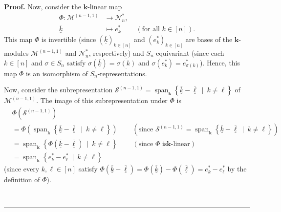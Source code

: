 \documentclass[numbers=enddot,12pt,final,onecolumn,notitlepage]{scrartcl}%
\theoremstyle{definition}
\newenvironment{proof}[1][Proof]{\noindent\textbf{#1.} }{\ \rule{0.5em}{0.5em}}
\begin{document}
\begin{proof}
Now, consider the $\mathbf{k}$-linear map%
\begin{align*}
\Phi:\mathcal{M}^{\left(  n-1,1\right)  }  &  \rightarrow\mathcal{N}_{n}%
^{\ast},\\
\underline{\overline{k}}  &  \mapsto e_{k}^{\ast}\ \ \ \ \ \ \ \ \ \ \left(
\text{for all }k\in\left[  n\right]  \right)  .
\end{align*}
This map $\Phi$ is invertible (since $\left(  \underline{\overline{k}}\right)
_{k\in\left[  n\right]  }$ and $\left(  e_{k}^{\ast}\right)  _{k\in\left[
n\right]  }$ are bases of the $\mathbf{k}$-modules $\mathcal{M}^{\left(
n-1,1\right)  }$ and $\mathcal{N}_{n}^{\ast}$, respectively) and $S_{n}%
$-equivariant (since each $k\in\left[  n\right]  $ and $\sigma\in S_{n}$
satisfy $\sigma\left(  \underline{\overline{k}}\right)  =\underline{\overline
{\sigma\left(  k\right)  }}$ and $\sigma\left(  e_{k}^{\ast}\right)
=e_{\sigma\left(  k\right)  }^{\ast}$). Hence, this map $\Phi$ is an
isomorphism of $S_{n}$-representations.

Now, consider the subrepresentation $\mathcal{S}^{\left(  n-1,1\right)
}=\operatorname*{span}\nolimits_{\mathbf{k}}\left\{  \underline{\overline{k}%
}-\underline{\overline{\ell}}\ \mid\ k\neq\ell\right\}  $ of $\mathcal{M}%
^{\left(  n-1,1\right)  }$. The image of this subrepresentation under $\Phi$
is
\begin{align}
&  \Phi\left(  \mathcal{S}^{\left(  n-1,1\right)  }\right) \nonumber\\
&  =\Phi\left(  \operatorname*{span}\nolimits_{\mathbf{k}}\left\{
\underline{\overline{k}}-\underline{\overline{\ell}}\ \mid\ k\neq\ell\right\}
\right)  \ \ \ \ \ \ \ \ \ \ \left(  \text{since }\mathcal{S}^{\left(
n-1,1\right)  }=\operatorname*{span}\nolimits_{\mathbf{k}}\left\{
\underline{\overline{k}}-\underline{\overline{\ell}}\ \mid\ k\neq\ell\right\}
\right) \nonumber\\
&  =\operatorname*{span}\nolimits_{\mathbf{k}}\left\{  \Phi\left(
\underline{\overline{k}}-\underline{\overline{\ell}}\right)  \ \mid\ k\neq
\ell\right\}  \ \ \ \ \ \ \ \ \ \ \left(  \text{since }\Phi\text{ is
}\mathbf{k}\text{-linear}\right) \nonumber\\
&  =\operatorname*{span}\nolimits_{\mathbf{k}}\left\{  e_{k}^{\ast}-e_{\ell
}^{\ast}\ \mid\ k\neq\ell\right\}  \label{pf.prop.Z-iso.a.2}%
\end{align}
(since every $k,\ell\in\left[  n\right]  $ satisfy $\Phi\left(
\underline{\overline{k}}-\underline{\overline{\ell}}\right)  =\Phi\left(
\underline{\overline{k}}\right)  -\Phi\left(  \underline{\overline{\ell}%
}\right)  =e_{k}^{\ast}-e_{\ell}^{\ast}$ by the definition of $\Phi$).


\end{proof}
\end{document}
